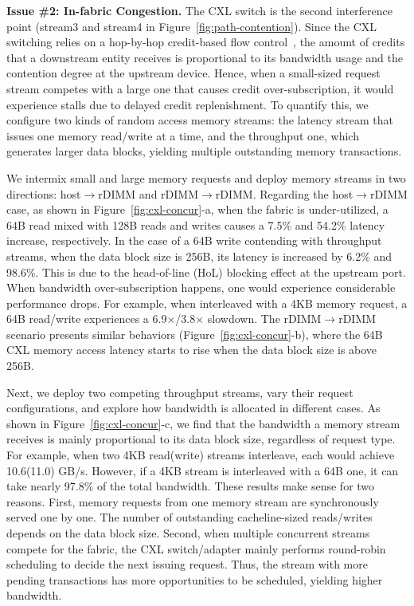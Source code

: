 \noindent
{\bf Issue \#2: In-fabric Congestion.} The CXL switch is the second interference point (stream3 and stream4 in Figure~\ref{fig:path-contention}). Since the CXL switching relies on a hop-by-hop credit-based flow control~\cite{cfc-sigcomm94, cfc-network95, rpcibench-nsdi24}, the amount of credits that a downstream entity receives is proportional to its bandwidth usage and the contention degree at the upstream device. Hence, when a small-sized request stream competes with a large one that causes credit over-subscription, it would experience stalls due to delayed credit replenishment. To quantify this, we configure two kinds of random access memory streams: the latency stream that issues one memory read/write at a time, and the throughput one, which generates larger data blocks, yielding multiple outstanding memory transactions. 

We intermix small and large memory requests and deploy memory streams in two directions: host$\rightarrow$rDIMM and rDIMM$\rightarrow$rDIMM. Regarding the host$\rightarrow$rDIMM case, as shown in Figure~\ref{fig:cxl-concur}-a, when the fabric is under-utilized, a 64B read mixed with 128B reads and writes causes a 7.5\% and 54.2\% latency increase, respectively. In the case of a 64B write contending with throughput streams, when the data block size is 256B, its latency is increased by 6.2\% and 98.6\%. This is due to the head-of-line (HoL) blocking effect at the upstream port. When bandwidth over-subscription happens, one would experience considerable performance drops. For example, when interleaved with a 4KB memory request, a 64B read/write experiences a 6.9$\times$/3.8$\times$ slowdown. The rDIMM$\rightarrow$rDIMM scenario presents similar behaviors (Figure~\ref{fig:cxl-concur}-b), where the 64B CXL memory access latency starts to rise when the data block size is above 256B. 

Next, we deploy two competing throughput streams, vary their request configurations, and explore how bandwidth is allocated in different cases. As shown in Figure~\ref{fig:cxl-concur}-c, we find that the bandwidth a memory stream receives is mainly proportional to its data block size, regardless of request type. For example, when two 4KB read(write) streams interleave, each would achieve 10.6(11.0) GB/s. However, if a 4KB stream is interleaved with a 64B one, it can take nearly 97.8\% of the total bandwidth. These results make sense for two reasons. First, memory requests from one memory stream are synchronously served one by one. The number of outstanding cacheline-sized reads/writes depends on the data block size. Second, when multiple concurrent streams compete for the fabric, the CXL switch/adapter mainly performs round-robin scheduling to decide the next issuing request. Thus, the stream with more pending transactions has more opportunities to be scheduled, yielding higher bandwidth.

